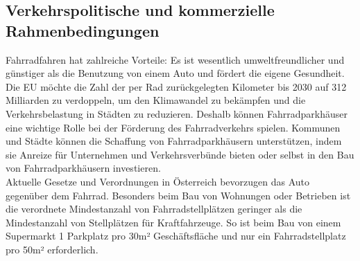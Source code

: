 \subsection{Verkehrspolitische und kommerzielle Rahmenbedingungen}

Fahrradfahren hat zahlreiche Vorteile: Es ist wesentlich umweltfreundlicher und günstiger als die Benutzung von einem Auto und fördert die eigene Gesundheit. Die EU möchte die Zahl der per Rad zurückgelegten Kilometer bis 2030 auf 312 Milliarden zu verdoppeln, um den Klimawandel zu bekämpfen und die Verkehrsbelastung in Städten zu reduzieren.  Deshalb können Fahrradparkhäuser eine wichtige Rolle bei der Förderung des Fahrradverkehrs spielen. Kommunen und Städte können die Schaffung von Fahrradparkhäusern unterstützen, indem sie Anreize für Unternehmen und Verkehrsverbünde bieten oder selbst in den Bau von Fahrradparkhäusern investieren.\\
Aktuelle Gesetze und Verordnungen in Österreich bevorzugen das Auto gegenüber dem Fahrrad. Besonders beim Bau von Wohnungen oder Betrieben ist die verordnete Mindestanzahl von Fahrradstellplätzen geringer als die Mindestanzahl von Stellplätzen für Kraftfahrzeuge.  So ist beim Bau von einem Supermarkt 1 Parkplatz pro 30m² Geschäftsfläche und nur ein Fahrradstellplatz pro 50m² erforderlich.\cite*{noauthor_ris_nodate} \\
